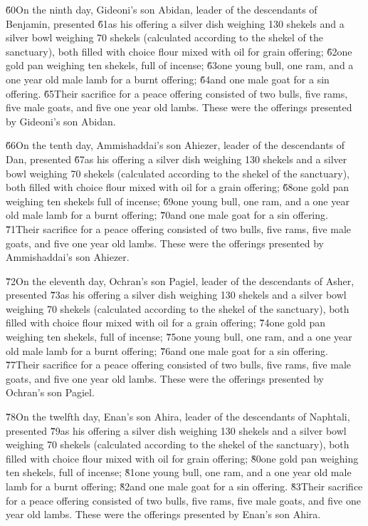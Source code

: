 \v{60}On the ninth day, Gideoni's son Abidan, leader of the descendants of Benjamin, presented \v{61}as his offering a silver dish weighing 130 shekels and a silver bowl weighing 70 shekels (calculated according to the shekel of the sanctuary), both filled with choice flour mixed with oil for grain offering; \v{62}one gold pan weighing ten shekels, full of incense; \v{63}one young bull, one ram, and a one year old male lamb for a burnt offering; \v{64}and one male goat for a sin offering. \v{65}Their sacrifice for a peace offering consisted of two bulls, five rams, five male goats, and five one year old lambs. These were the offerings presented by Gideoni's son Abidan.

\v{66}On the tenth day, Ammishaddai's son Ahiezer, leader of the descendants of Dan, presented \v{67}as his offering a silver dish weighing 130 shekels and a silver bowl weighing 70 shekels (calculated according to the shekel of the sanctuary), both filled with choice flour mixed with oil for a grain offering; \v{68}one gold pan weighing ten shekels full of incense; \v{69}one young bull, one ram, and a one year old male lamb for a burnt offering; \v{70}and one male goat for a sin offering. \v{71}Their sacrifice for a peace offering consisted of two bulls, five rams, five male goats, and five one year old lambs. These were the offerings presented by Ammishaddai's son Ahiezer.

\v{72}On the eleventh day, Ochran's son Pagiel, leader of the descendants of Asher, presented \v{73}as his offering a silver dish weighing 130 shekels and a silver bowl weighing 70 shekels (calculated according to the shekel of the sanctuary), both filled with choice flour mixed with oil for a grain offering; \v{74}one gold pan weighing ten shekels, full of incense; \v{75}one young bull, one ram, and a one year old male lamb for a burnt offering; \v{76}and one male goat for a sin offering. \v{77}Their sacrifice for a peace offering consisted of two bulls, five rams, five male goats, and five one year old lambs. These were the offerings presented by Ochran's son Pagiel.

\v{78}On the twelfth day, Enan's son Ahira, leader of the descendants of Naphtali, presented \v{79}as his offering a silver dish weighing 130 shekels and a silver bowl weighing 70 shekels (calculated according to the shekel of the sanctuary), both filled with choice flour mixed with oil for grain offering; \v{80}one gold pan weighing ten shekels, full of incense; \v{81}one young bull, one ram, and a one year old male lamb for a burnt offering; \v{82}and one male goat for a sin offering. \v{83}Their sacrifice for a peace offering consisted of two bulls, five rams, five male goats, and five one year old lambs. These were the offerings presented by Enan's son Ahira.

